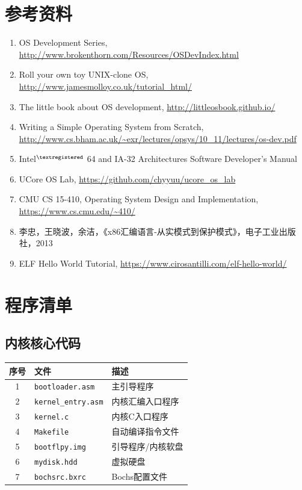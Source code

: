 \documentclass[logo,reportComp]{thesis}
\begin{document}
\section{参考资料}
\begin{enumerate}
	\item OS Development Series, \url{http://www.brokenthorn.com/Resources/OSDevIndex.html}
	\item Roll your own toy UNIX-clone OS, \url{http://www.jamesmolloy.co.uk/tutorial_html/}
	\item The little book about OS development, \url{http://littleosbook.github.io/}
	\item Writing a Simple Operating System from Scratch, \url{http://www.cs.bham.ac.uk/~exr/lectures/opsys/10_11/lectures/os-dev.pdf}
	\item Intel$^{\textregistered}$ 64 and IA-32 Architectures Software Developer's Manual
	\item UCore OS Lab, \url{https://github.com/chyyuu/ucore_os_lab}
	\item CMU CS 15-410, Operating System Design and Implementation, \url{https://www.cs.cmu.edu/~410/}
	\item 李忠，王晓波，余洁，《x86汇编语言-从实模式到保护模式》，电子工业出版社，2013
	\item ELF Hello World Tutorial, \url{https://www.cirosantilli.com/elf-hello-world/}
\end{enumerate}

\appendix
\appendixconfig
\section{程序清单}
\subsection{内核核心代码}
\begin{center}
\begin{tabular}{|c|l|l|}\hline
\textbf{序号} & \textbf{文件} & \textbf{描述} \\\hline
1 & \verb'bootloader.asm' & 主引导程序\\\hline
2 & \verb'kernel_entry.asm' & 内核汇编入口程序\\\hline
3 & \verb'kernel.c' & 内核C入口程序\\\hline
4 & \verb'Makefile' & 自动编译指令文件\\\hline
5 & \verb'bootflpy.img' & 引导程序/内核软盘\\\hline
6 & \verb'mydisk.hdd' & 虚拟硬盘\\\hline
7 & \verb'bochsrc.bxrc' & Bochs配置文件\\\hline
\end{tabular}
\end{center}
\end{document}
